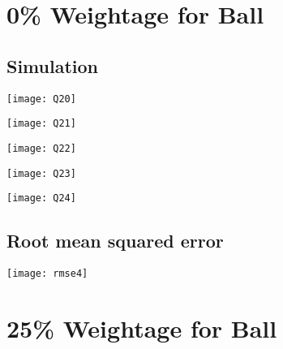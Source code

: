 \documentclass[a4paper, 12pt]{article}
\begin{document}
\section{0\% Weightage for Ball}

\subsection{Simulation}
\begin{center}
\begin{minipage}{0.45\linewidth}
    \texttt{[image: Q20]}
    \label{fig:Q1_1}
\end{minipage}
\hfill
\begin{minipage}{0.45\linewidth}
    \texttt{[image: Q21]}
    \label{fig:Q1_2}
\end{minipage}
\vspace{1.5 em}

\begin{minipage}{0.45\linewidth}
    \texttt{[image: Q22]}
    \label{fig:Q1_1}
\end{minipage}
\hfill
\begin{minipage}{0.45\linewidth}
    \texttt{[image: Q23]}
    \label{fig:Q1_2}
\end{minipage}
\vspace{1.5 em}


\begin{minipage}{0.45\linewidth}
    \texttt{[image: Q24]}
    \label{fig:Q1_3}
\end{minipage}
\end{center}

\subsection{Root mean squared error}

\begin{center}
\begin{minipage}{0.7\linewidth}
    \texttt{[image: rmse4]}
    \label{fig:Q1_3}
\end{minipage}
\end{center}


\section{25\% Weightage for Ball}
\end{document}
